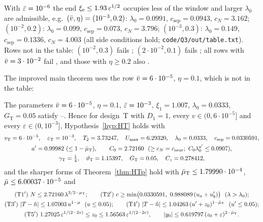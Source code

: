 With $\bar\varepsilon=10^{-6}$ the end $\xi_{\mathrm e}\le1.93\,\varepsilon^{1/2}$ occupies less of the window and larger $\lambda_0$ are admissible, e.g.\
$(\bar v,\eta)=(10^{-3},0.2)$: $\lambda_0=0.0991$, $c_{\mathrm{sep}}=0.0943$, $c_N=3.162$; $(10^{-2},0.2)$: $\lambda_0=0.099$,
$c_{\mathrm{sep}}=0.073$, $c_N=3.796$; $(10^{-3},0.3)$: $\lambda_0=0.149$, $c_{\mathrm{sep}}=0.1336$, $c_N=4.003$ (all side conditions hold;
\texttt{code/Q3/out/table.txt}). Rows not in the table: $(10^{-2},0.3)$ fails ; $(2\cdot10^{-2},0.1)$ fails \HTSC{42}; all
rows with $\bar v=3\cdot10^{-2}$ fail \HTSC{42}, and those with $\eta\ge0.2$ also \HTSC{21}.

The improved main theorem uses the row $\bar v=6\cdot10^{-5}$, $\eta=0.1$, which is not in the table:

\begin{corollary}\label{cor:HTp-used}
The parameters $\bar v=6\cdot10^{-5}$, $\eta=0.1$, $\bar\varepsilon=10^{-3}$, $\xi_1=1.007$, $\lambda_0=0.0333$, $G_{\mathrm T}=0.05$ satisfy
\HTSC1--\HTSC{51}. Hence for design~T with $D_1=1$, every $v\in(0,6\cdot10^{-5}]$ and every $\varepsilon\in(0,10^{-3}]$, Hypothesis~\ref{hyp:HT}
holds with
\begin{gather*}
v_{\mathrm T}=6\cdot10^{-5},\quad\varepsilon_{\mathrm T}=10^{-3},\quad T_2=3.73247,\quad U_{\max}=6.29320,\quad\lambda_0=0.0333,\quad
c_{\mathrm{sep}}=0.0330591,\\
a'=0.99982\ (\le1-\bar\mu_{\mathrm T}),\qquad C_0=2.72160\ \ (\ge c_N=c_{\mathrm{near}};\ C_0\lambda_0^{a'}\le0.0907),\\
\gamma_{\mathrm T}=\tfrac14,\quad\vartheta_{\mathrm T}=1.15397,\quad G_{\mathrm T}=0.05,\quad C_z=0.278412,
\end{gather*}
and the sharper forms of Theorem~\ref{thm:HTp} hold with $\bar\mu_{\mathrm T}\le1.79990\cdot10^{-4}$, $\bar\mu\le6.00037\cdot10^{-5}$ and
\begin{gather*}
\textup{(T1$'$)}\ N\le2.72160\,\lambda^{3/2-\TDmT};\qquad
\textup{(T2$'$)}\ c\ge\min\bigl(0.0330591,\ 0.988089\,(u_a+u'_b)\bigr)\ \ (\lambda>\lambda_0);\\
\textup{(T3$'$)}\ |T-\hat n|\le1.07003\,u^{1-\mu}\ \ (u\le0.05);\qquad
\textup{(T4$'$)}\ |T-\hat n|\le1.04263\,(u'+z_0)^{1-\HTmTb}\ \ (u'\le0.05);\\
\textup{(T5$'$)}\ 1.27025\,\varepsilon^{1/(2-2v)}\le z_0\le1.56563\,\varepsilon^{1/(2-2v)},\qquad|y_0|\le0.619797\,(z_0+\varepsilon)^{2-\HTmTb}.
\end{gather*}
\end{corollary}
